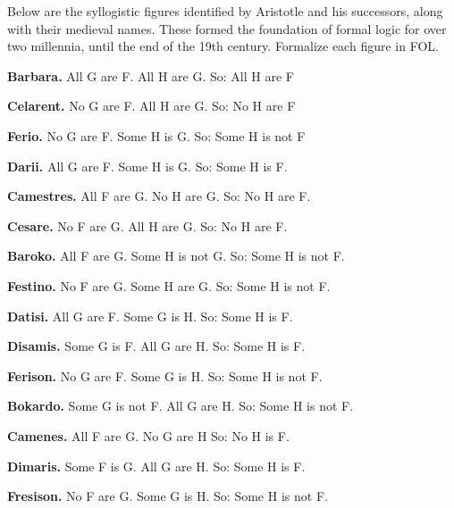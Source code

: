 \practiceproblems
\problempart\label{pr.BarbaraEtc}
Below are the syllogistic figures identified by Aristotle and his successors, along with their medieval names.  These formed the foundation of formal logic for over two millennia, until the end of the 19th century.  Formalize each figure in FOL.

\begin{ebullet}
	\item \textbf{Barbara.} All G are F. All H are G. So:  All H are F
	\item \textbf{Celarent.} No G are F. All H are G. So: No H are F
	\item \textbf{Ferio.} No G are F. Some H is G. So: Some H is not F
	\item \textbf{Darii.} All G are F. Some H is G. So: Some H is F.
	\item \textbf{Camestres.} All F are G. No H are G. So: No H are F.
	\item \textbf{Cesare.} No F are G. All H are G. So: No H are F.
	\item \textbf{Baroko.} All F are G. Some H is not G. So: Some H is not F.
	\item \textbf{Festino.} No F are G. Some H are G. So: Some H is not F.
	\item \textbf{Datisi.} All G are F. Some G is H. So: Some H is F.
	\item \textbf{Disamis.} Some G is F. All G are H. So: Some H is F.
	\item \textbf{Ferison.} No G are F. Some G is H. So: Some H is not F.
	\item \textbf{Bokardo.} Some G is not F. All G are H. So:  Some H is not F.
	\item \textbf{Camenes.} All F are G. No G are H So: No H is F.
	\item \textbf{Dimaris.} Some F is G. All G are H. So: Some H is F.
	\item \textbf{Fresison.} No F are G. Some G is H. So: Some H is not F.
\end{ebullet}


\

